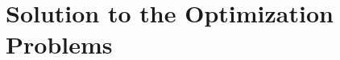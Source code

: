 \documentclass[../rt_server_main.tex]{subfiles}
\begin{document}

\appendix





% 
% 

\section{Solution to the Optimization Problems} \label{appsec:gp}



 
\end{document}
